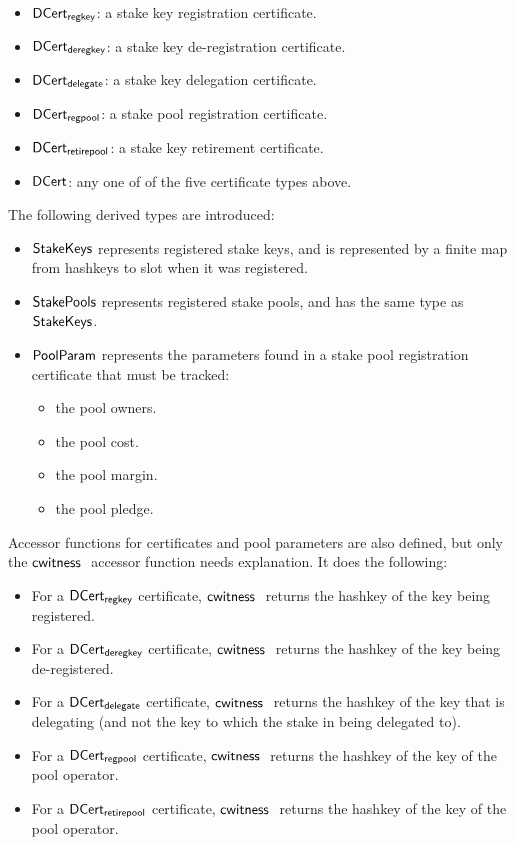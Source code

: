 \begin{itemize}
\item $\mathsf{DCert_{regkey}}$: a stake key registration certificate.
\item $\mathsf{DCert_{deregkey}}$: a stake key de-registration certificate.
\item $\mathsf{DCert_{delegate}}$: a stake key delegation certificate.
\item $\mathsf{DCert_{regpool}}$: a stake pool registration certificate.
\item $\mathsf{DCert_{retirepool}}$: a stake key retirement certificate.
\item $\mathsf{DCert}$: any one of of the five certificate types above.
\end{itemize}
The following derived types are introduced:
\begin{itemize}
  \item $\mathsf{StakeKeys}$ represents registered stake keys, and is represented by a finite
    map from hashkeys to slot when it was registered.
  \item$\mathsf{StakePools}$ represents registered stake pools, and has the same type as
    $\mathsf{StakeKeys}$.
\item $\mathsf{PoolParam}$ represents the parameters found in a stake pool registration certificate
  that must be tracked:
  \begin{itemize}
    \item the pool owners.
    \item the pool cost.
    \item the pool margin.
    \item the pool pledge.
  \end{itemize}
\end{itemize}

Accessor functions for certificates and pool parameters are also defined, but
only the $\mathsf{cwitness}~ \mathit{}$ accessor function needs explanation.
It does the following:
\begin{itemize}
\item For a $\mathsf{DCert_{regkey}}$ certificate, $\mathsf{cwitness}~ \mathit{}$ returns the hashkey
  of the key being registered.
\item For a $\mathsf{DCert_{deregkey}}$ certificate, $\mathsf{cwitness}~ \mathit{}$ returns the hashkey
  of the key being de-registered.
\item For a $\mathsf{DCert_{delegate}}$ certificate, $\mathsf{cwitness}~ \mathit{}$ returns the hashkey
  of the key that is delegating (and not the key to which the stake in being delegated to).
\item For a $\mathsf{DCert_{regpool}}$ certificate, $\mathsf{cwitness}~ \mathit{}$ returns the hashkey
  of the key of the pool operator.
\item For a $\mathsf{DCert_{retirepool}}$ certificate, $\mathsf{cwitness}~ \mathit{}$ returns the hashkey
  of the key of the pool operator.
\end{itemize}

